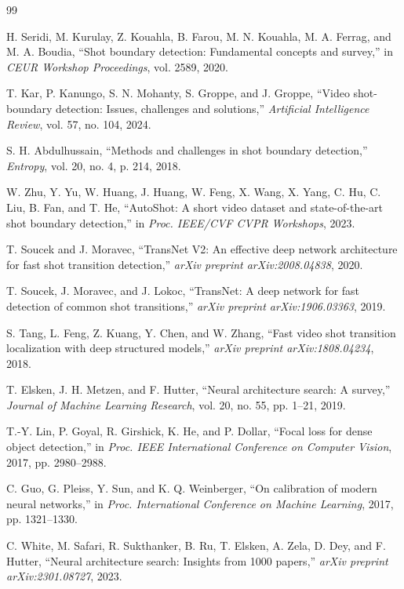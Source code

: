 \documentclass[journal]{IEEEtran}
\begin{document}
\begin{thebibliography}{99}

H. Seridi, M. Kurulay, Z. Kouahla, B. Farou, M. N. Kouahla, M. A. Ferrag, and M. A. Boudia, ``Shot boundary detection: Fundamental concepts and survey,'' in \emph{CEUR Workshop Proceedings}, vol. 2589, 2020.

T. Kar, P. Kanungo, S. N. Mohanty, S. Groppe, and J. Groppe, ``Video shot-boundary detection: Issues, challenges and solutions,'' \emph{Artificial Intelligence Review}, vol. 57, no. 104, 2024.

S. H. Abdulhussain, ``Methods and challenges in shot boundary detection,'' \emph{Entropy}, vol. 20, no. 4, p. 214, 2018.

W. Zhu, Y. Yu, W. Huang, J. Huang, W. Feng, X. Wang, X. Yang, C. Hu, C. Liu, B. Fan, and T. He, ``AutoShot: A short video dataset and state-of-the-art shot boundary detection,'' in \emph{Proc. IEEE/CVF CVPR Workshops}, 2023.

T. Soucek and J. Moravec, ``TransNet V2: An effective deep network architecture for fast shot transition detection,'' \emph{arXiv preprint arXiv:2008.04838}, 2020.

T. Soucek, J. Moravec, and J. Lokoc, ``TransNet: A deep network for fast detection of common shot transitions,'' \emph{arXiv preprint arXiv:1906.03363}, 2019.

S. Tang, L. Feng, Z. Kuang, Y. Chen, and W. Zhang, ``Fast video shot transition localization with deep structured models,'' \emph{arXiv preprint arXiv:1808.04234}, 2018.

T. Elsken, J. H. Metzen, and F. Hutter, ``Neural architecture search: A survey,'' \emph{Journal of Machine Learning Research}, vol. 20, no. 55, pp. 1--21, 2019.

T.-Y. Lin, P. Goyal, R. Girshick, K. He, and P. Dollar, ``Focal loss for dense object detection,'' in \emph{Proc. IEEE International Conference on Computer Vision}, 2017, pp. 2980--2988.

C. Guo, G. Pleiss, Y. Sun, and K. Q. Weinberger, ``On calibration of modern neural networks,'' in \emph{Proc. International Conference on Machine Learning}, 2017, pp. 1321--1330.

C. White, M. Safari, R. Sukthanker, B. Ru, T. Elsken, A. Zela, D. Dey, and F. Hutter, ``Neural architecture search: Insights from 1000 papers,'' \emph{arXiv preprint arXiv:2301.08727}, 2023.


\end{thebibliography}
\end{document}
